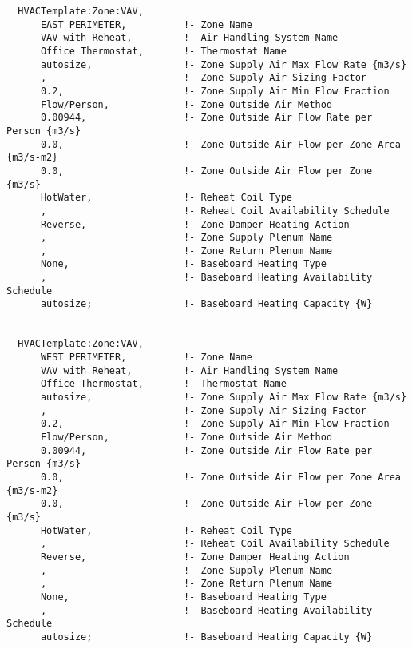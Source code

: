 \begin{lstlisting}
  HVACTemplate:Zone:VAV,
      EAST PERIMETER,          !- Zone Name
      VAV with Reheat,         !- Air Handling System Name
      Office Thermostat,       !- Thermostat Name
      autosize,                !- Zone Supply Air Max Flow Rate {m3/s}
      ,                        !- Zone Supply Air Sizing Factor
      0.2,                     !- Zone Supply Air Min Flow Fraction
      Flow/Person,             !- Zone Outside Air Method
      0.00944,                 !- Zone Outside Air Flow Rate per Person {m3/s}
      0.0,                     !- Zone Outside Air Flow per Zone Area {m3/s-m2}
      0.0,                     !- Zone Outside Air Flow per Zone {m3/s}
      HotWater,                !- Reheat Coil Type
      ,                        !- Reheat Coil Availability Schedule
      Reverse,                 !- Zone Damper Heating Action
      ,                        !- Zone Supply Plenum Name
      ,                        !- Zone Return Plenum Name
      None,                    !- Baseboard Heating Type
      ,                        !- Baseboard Heating Availability Schedule
      autosize;                !- Baseboard Heating Capacity {W}


  HVACTemplate:Zone:VAV,
      WEST PERIMETER,          !- Zone Name
      VAV with Reheat,         !- Air Handling System Name
      Office Thermostat,       !- Thermostat Name
      autosize,                !- Zone Supply Air Max Flow Rate {m3/s}
      ,                        !- Zone Supply Air Sizing Factor
      0.2,                     !- Zone Supply Air Min Flow Fraction
      Flow/Person,             !- Zone Outside Air Method
      0.00944,                 !- Zone Outside Air Flow Rate per Person {m3/s}
      0.0,                     !- Zone Outside Air Flow per Zone Area {m3/s-m2}
      0.0,                     !- Zone Outside Air Flow per Zone {m3/s}
      HotWater,                !- Reheat Coil Type
      ,                        !- Reheat Coil Availability Schedule
      Reverse,                 !- Zone Damper Heating Action
      ,                        !- Zone Supply Plenum Name
      ,                        !- Zone Return Plenum Name
      None,                    !- Baseboard Heating Type
      ,                        !- Baseboard Heating Availability Schedule
      autosize;                !- Baseboard Heating Capacity {W}



\end{lstlisting}
